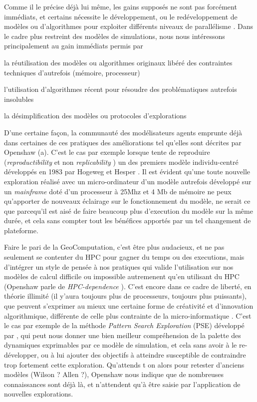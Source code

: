 Comme il le précise déjà lui même, les gains supposés ne sont pas forcément immédiats, et certains nécessite le développement, ou le redéveloppement de modèles ou d'algorithmes pour exploiter différents niveaux de parallélisme . Dans le cadre plus restreint des modèles de simulations, nous nous intéressons principalement au gain immédiats permis par \begin{enumerate*}[label=(\alph*)]  \item la réutilisation des modèles ou algorithmes originaux libéré des contraintes techniques d'autrefois (mémoire, processeur)  \item l'utilisation d'algorithmes récent pour résoudre des problématiques autrefois insolubles \item la désimplification des modèles ou protocoles d'explorations \end{enumerate*}

D'une certaine façon, la communauté des modélisateurs agents emprunte déjà dans certaines de ces pratiques des améliorations tel qu'elles sont décrites par Openshaw (a). C'est le cas par exemple lorsque \autocite{Brearcliffe2014} tente de reproduire (\textit{reproductibility} et non \textit{replicability} ) un des premiers modèle individu-centré développés en 1983 par Hogeweg et Hesper \autocite{Hogeweg1983}. Il est évident qu'une toute nouvelle exploration réalisé avec un micro-ordinateur d'un modèle autrefois développé sur un \textit{mainframe} doté d'un processeur à 25Mhz et 4 Mb de mémoire ne peux qu'apporter de nouveaux éclairage sur le fonctionnement du modèle, ne serait ce que parcequ'il est aisé de faire beaucoup plus d'execution du modèle sur la même durée, et cela sans compter tout les bénéfices apportés par un tel changement de plateforme.

Faire le pari de la GeoComputation, c'est être plus audacieux, et ne pas seulement se contenter du HPC pour gagner du temps ou des executions, mais d'intégrer un style de pensée à nos pratiques qui valide l'utilisation sur nos modèles de calcul difficile ou impossible autremenent qu'en utilisant du HPC (Openshaw parle de \textit{HPC-dependence} ). C'est encore dans ce cadre de liberté, en théorie illimité (il y'aura toujours plus de processeurs, toujours plus puissants), que peuvent s'exprimer au mieux une certaine forme de créativité et d'innovation algorithmique, différente de celle plus contrainte de la micro-informatique \autocite[26-28]{Openshaw2000}. C'est le cas par exemple de la méthode \textit{Pattern Search Exploration} (PSE) développé par \textcite{Cherel2015}, qui peut nous donner une bien meilleur compréhension de la palette des dynamiques exprimables par ce modèle de simulation, et cela sans avoir à le re-développer, ou à lui ajouter des objectifs à atteindre susceptible de contraindre trop fortement cette exploration. Qu'attends t on alors pour retester d'anciens modèles (Wilson ? Allen ?), Openshaw nous indique que de nombreuses connaissances sont déjà là, et n'attendent qu'à être saisie par l'application de nouvelles explorations.


